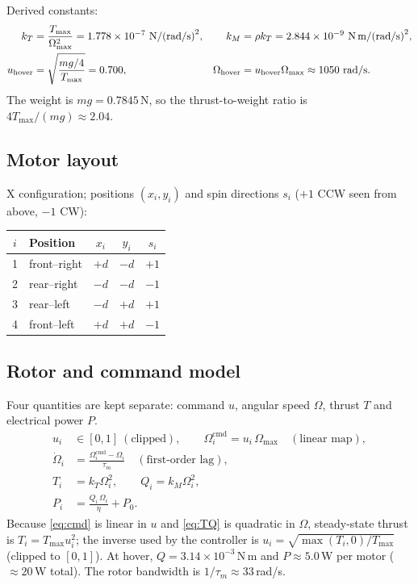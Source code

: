 \documentclass[11pt,a4paper]{article}
\begin{document}
Derived constants:
\begin{align}
k_T&=\frac{T_{\max}}{\Omega_{\max}^2}=1.778\times10^{-7}\ \text{N/(rad/s)}^2, & k_M&=\rho k_T=2.844\times10^{-9}\ \text{N\,m/(rad/s)}^2,\\
u_{\text{hover}}&=\sqrt{\frac{mg/4}{T_{\max}}}=0.700, & \Omega_{\text{hover}}&=u_{\text{hover}}\Omega_{\max}\approx1050\ \text{rad/s}.
\end{align}
The weight is $mg=0.7845$\,N, so the thrust-to-weight ratio is $4T_{\max}/(mg)\approx2.04$.

\subsection{Motor layout}
X configuration; positions $(x_i,y_i)$ and spin directions $s_i$ ($+1$ CCW seen from above, $-1$ CW):
\begin{center}\small
\begin{tabular}{@{}clccc@{}}
\toprule
$i$ & Position & $x_i$ & $y_i$ & $s_i$ \\ \midrule
1 & front--right & $+d$ & $-d$ & $+1$ \\
2 & rear--right & $-d$ & $-d$ & $-1$ \\
3 & rear--left & $-d$ & $+d$ & $+1$ \\
4 & front--left & $+d$ & $+d$ & $-1$ \\ \bottomrule
\end{tabular}
\end{center}

\subsection{Rotor and command model}
Four quantities are kept separate: command $u$, angular speed $\Omega$, thrust $T$ and electrical power $P$.
\begin{align}
u_i&\in[0,1]\ (\text{clipped}),\qquad \Omega_i^{\text{cmd}}=u_i\,\Omega_{\max}\quad(\text{linear map}),\label{eq:cmd}\\
\dot\Omega_i&=\frac{\Omega_i^{\text{cmd}}-\Omega_i}{\tau_m}\quad(\text{first-order lag}),\label{eq:lag}\\
T_i&=k_T\Omega_i^2,\qquad Q_i=k_M\Omega_i^2,\label{eq:TQ}\\
P_i&=\frac{Q_i\,\Omega_i}{\eta}+P_0.\label{eq:P}
\end{align}
Because \eqref{eq:cmd} is linear in $u$ and \eqref{eq:TQ} is quadratic in $\Omega$, steady-state thrust is $T_i=T_{\max}u_i^2$; the inverse used by the controller is
$u_i=\sqrt{\max(T_i,0)/T_{\max}}$ (clipped to $[0,1]$). At hover, $Q=3.14\times10^{-3}$\,N\,m and $P\approx5.0$\,W per motor ($\approx20$\,W total).
The rotor bandwidth is $1/\tau_m\approx33$\,rad/s.
\end{document}
